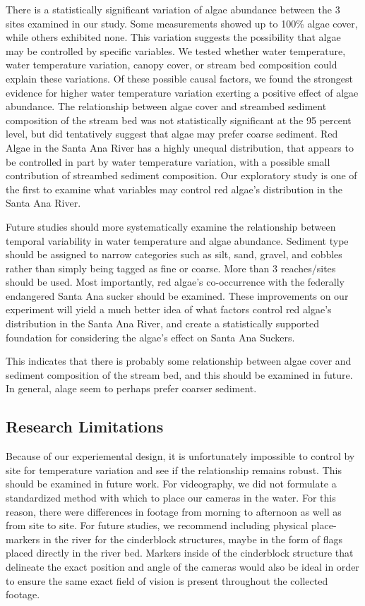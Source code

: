 \documentclass{article}\usepackage[]{graphicx}\usepackage[]{color}
\begin{document}
There is a statistically significant variation of algae abundance between the 3 sites examined in our study. Some measurements showed up to 100\% algae cover, while others exhibited none. This variation suggests the possibility that algae may be controlled by specific variables. We tested whether water temperature, water temperature variation, canopy cover, or stream bed composition could explain these variations. Of these possible causal factors, we found the strongest evidence for higher water temperature variation exerting a positive effect of algae abundance. The relationship between algae cover and streambed sediment composition of the stream bed was not statistically significant at the 95 percent level, but did tentatively suggest that algae may prefer coarse sediment. Red Algae in the Santa Ana River has a highly unequal distribution, that appears to be controlled in part by water temperature variation, with a possible small contribution of streambed sediment composition. 
Our exploratory study is one of the first to examine what variables may control red algae's distribution in the Santa Ana River. 

Future studies should more systematically examine the relationship between temporal variability in water temperature and algae abundance. Sediment type should be assigned to narrow categories such as silt, sand, gravel, and cobbles rather than simply being tagged as fine or coarse. More than 3 reaches/sites should be used. Most importantly, red algae's co-occurrence with the federally endangered Santa Ana sucker should be examined. These improvements on our experiment will yield a much better idea of what factors control red algae's distribution in the Santa Ana River, and create a statistically supported foundation for considering the algae's effect on Santa Ana Suckers.

This indicates that there is probably some relationship between algae cover and sediment composition of the stream bed, and this should be examined in future. In general, alage seem to perhaps prefer coarser sediment. 

\subsection{Research Limitations}
Because of our experiemental design, it is unfortunately impossible to control by site for temperature variation and see if the relationship remains robust. This should be examined in future work. For videography, we did not formulate a standardized method with which to place our cameras in the water. For this reason, there were differences in footage from morning to afternoon as well as from site to site. For future studies, we recommend including physical place-markers in the river for the cinderblock structures, maybe in the form of flags placed directly in the river bed. Markers inside of the cinderblock structure that delineate the exact position and angle of the cameras would also be ideal in order to ensure the same exact field of vision is present throughout the collected footage. 
\end{document}
